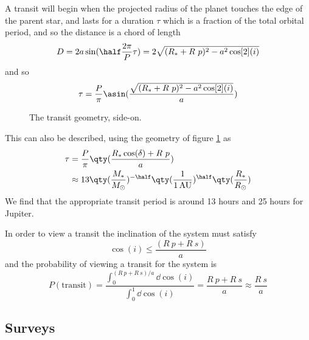 A transit will begin when the projected radius of the planet touches
the edge of the parent star, and lasts for a duration $\tau$ which is
a fraction of the total orbital period, and so the distance is a chord
of length
\begin{equation}
  \label{eq:22}
  D = 2 a \sin( \half \frac{2 \pi}{P} \tau) = 2 \sqrt{( R_{*} + R~p)^2 - a^2 \cos[2](i)}
\end{equation}
and so
\begin{equation}
  \label{eq:23}
  \tau = \frac{P}{\pi} \asin( \frac{\sqrt{(R_{*}+R~p)^2 - a^2 \cos[2](i)}}{a} )
\end{equation}
\begin{figure}[b]
  \centering
  \caption{The transit geometry, side-on.}
  \label{fig:transit-geometry-2}
\end{figure}
This can also be described, using the geometry of figure
\ref{fig:transit-geometry-2} as
\begin{align*}
  \label{eq:24}
  \tau &= \frac{P}{\pi} \qty( \frac{R_{*} \cos(\delta) + R~p}{a} ) \\ &\approx 13 \qty( \frac{M_{*}}{M_{\odot}})^{-\half} \qty( \frac{1}{1\,\text{AU}} )^{\half} \qty( \frac{R_{*}}{R_{\odot}} )
\end{align*}
We find that the appropriate transit period is around 13 hours and 25
hours for Jupiter.

In order to view a transit the inclination of the system must
satisfy \[ \cos(i) \le \frac{(R~p + R~s)}{a} \] and the probability of
viewing a transit for the system is
\begin{equation}
  \label{eq:25}
  P(\text{transit}) = \frac{\int_0^{(R~p+R~s)/a} \dd{\cos(i)}}{\int_0^1 \dd{\cos(i)}} = \frac{R~p + R~s}{a} \approx \frac{R~s}{a}
\end{equation}

\subsection{Surveys}
\label{sec:surveys-3}

